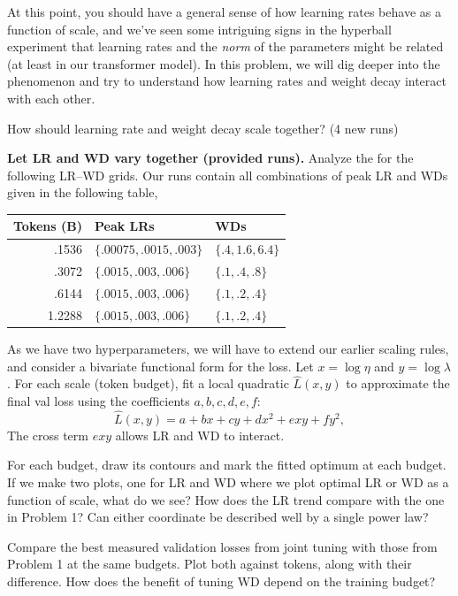 \clearpage
{}

At this point, you should have a general sense of how learning rates behave as a function of scale, and we've seen some intriguing signs in the hyperball experiment that learning rates and the \emph{norm} of the parameters might be related (at least in our transformer model). In this problem, we will dig deeper into the phenomenon and try to understand how learning rates and weight decay interact with each other.

\begin{problem}{How should learning rate and weight decay scale together? (4 new runs)}
\begin{parts}
\item \textbf{Let LR and WD vary together (provided runs).}
Analyze the \providedSweeps{} for the following LR--WD grids.
Our runs contain all combinations of peak LR and WDs given in the following table,
\begin{center}
\begin{tabular}{rll}
\toprule
Tokens (B) & Peak LRs & WDs \\
\midrule
.1536 & $\{.00075,.0015,.003\}$ & $\{.4,1.6,6.4\}$ \\
.3072 & $\{.0015,.003,.006\}$ & $\{.1,.4,.8\}$ \\
.6144 & $\{.0015,.003,.006\}$ & $\{.1,.2,.4\}$ \\
1.2288 & $\{.0015,.003,.006\}$ & $\{.1,.2,.4\}$ \\
\bottomrule
\end{tabular}
\end{center}

As we have two hyperparameters, we will have to extend our earlier scaling rules, and consider a bivariate functional form for the loss.
Let $x=\log\eta$ and $y=\log\lambda$. For each scale (token budget), fit a local quadratic $\widehat L(x,y)$ to approximate the final val loss using the coefficients
$a,b,c,d,e,f$:
\[
 \widehat L(x,y)=a+b x+c y+d x^2+e xy+f y^2,
\]
The cross term $e xy$ allows LR and WD to interact.

For each budget, draw its contours and mark the fitted optimum at each budget. If we make two plots, one for LR and WD where we plot optimal LR or WD as a function of scale, what do we see?
How does the LR trend compare with the one in Problem 1?
Can either coordinate be described well by a single power law?

Compare the best measured validation losses from joint tuning with those from Problem 1 at the same budgets. Plot both against tokens, along with their difference. How does the benefit of tuning WD depend on the training budget?


\end{parts}
\end{problem}

